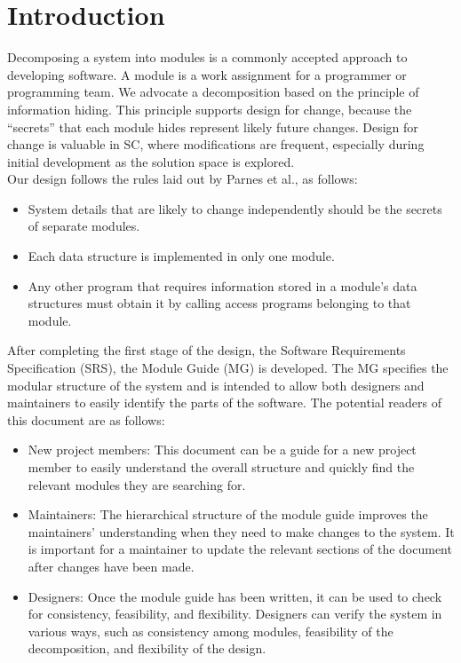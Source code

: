 \documentclass[12pt, titlepage]{article}
\begin{document}
\newpage

\tableofcontents

\listoftables

\listoffigures

\newpage

\section{Introduction}

Decomposing a system into modules is a commonly accepted approach to developing software.  A module is a work assignment for a programmer or programming
team.  We advocate a decomposition based on the principle of information hiding. This principle supports design for change, because the ``secrets'' that
each module hides represent likely future changes.  Design for change is valuable in SC, where modifications are frequent, especially during initial
development as the solution space is explored. \\

\noindent Our design follows the rules laid out by Parnes et al., as follows:
\begin{itemize}
\item System details that are likely to change independently should be the
  secrets of separate modules.
\item Each data structure is implemented in only one module.
\item Any other program that requires information stored in a module's data
  structures must obtain it by calling access programs belonging to that module.
\end{itemize}

\noindent After completing the first stage of the design, the Software Requirements
Specification (SRS), the Module Guide (MG) is developed. The MG
specifies the modular structure of the system and is intended to allow both
designers and maintainers to easily identify the parts of the software.  The
potential readers of this document are as follows:

\begin{itemize}
\item New project members: This document can be a guide for a new project member
  to easily understand the overall structure and quickly find the
  relevant modules they are searching for.
\item Maintainers: The hierarchical structure of the module guide improves the
  maintainers' understanding when they need to make changes to the system. It is
  important for a maintainer to update the relevant sections of the document
  after changes have been made.
\item Designers: Once the module guide has been written, it can be used to
  check for consistency, feasibility, and flexibility. Designers can verify the
  system in various ways, such as consistency among modules, feasibility of the
  decomposition, and flexibility of the design.
\end{itemize}
\end{document}

